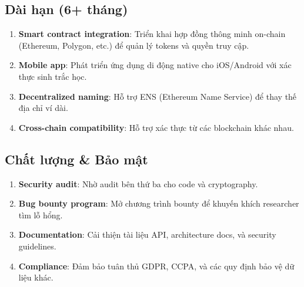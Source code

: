 \subsection*{Dài hạn (6+ tháng)}
\begin{enumerate}
  \item \textbf{Smart contract integration}: Triển khai hợp đồng thông minh on-chain (Ethereum, Polygon, etc.) để quản lý tokens và quyền truy cập.
  \item \textbf{Mobile app}: Phát triển ứng dụng di động native cho iOS/Android với xác thực sinh trắc học.
  \item \textbf{Decentralized naming}: Hỗ trợ ENS (Ethereum Name Service) để thay thế địa chỉ ví dài.
  \item \textbf{Cross-chain compatibility}: Hỗ trợ xác thực từ các blockchain khác nhau.
\end{enumerate}

\subsection*{Chất lượng \& Bảo mật}
\begin{enumerate}
  \item \textbf{Security audit}: Nhờ audit bên thứ ba cho code và cryptography.
  \item \textbf{Bug bounty program}: Mở chương trình bounty để khuyến khích researcher tìm lỗ hổng.
  \item \textbf{Documentation}: Cải thiện tài liệu API, architecture docs, và security guidelines.
  \item \textbf{Compliance}: Đảm bảo tuân thủ GDPR, CCPA, và các quy định bảo vệ dữ liệu khác.
\end{enumerate}

